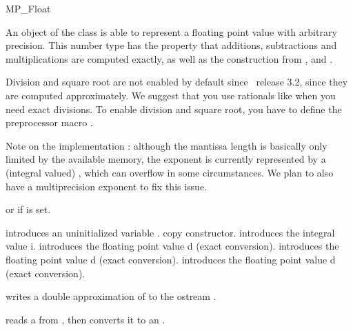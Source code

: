 
\begin{ccRefClass} {MP_Float}

\ccDefinition
An object of the class  is able to represent a floating point
value with arbitrary precision.  This number type has the property that
additions, subtractions and multiplications are computed exactly, as well as
the construction from ,  and .

Division and square root are not enabled by default since \cgal\ release 3.2,
since they are computed approximately.  We suggest that you use
rationals like  when you need exact divisions.
To enable division and square root, you have to define the preprocessor
macro .

Note on the implementation : although the mantissa length is basically only
limited by the available memory, the exponent is currently represented by a
(integral valued) , which can overflow in some circumstances.  We
plan to also have a multiprecision exponent to fix this issue.


\ccIsModel
{}
or  if  is set.

\ccCreation
{}

{introduces an uninitialized variable \ccVar.}
\ccGlue
{}
{copy constructor.}
\ccGlue
{}
{introduces the integral value i.}
\ccGlue
{}
{introduces the floating point value d (exact conversion).}
\ccGlue
{}
{introduces the floating point value d (exact conversion).}
\ccGlue
{}
{introduces the floating point value d (exact conversion).}

\ccOperations

{writes a double approximation of  to the ostream .}

{reads a  from , then converts it to an .}


\end{ccRefClass}
